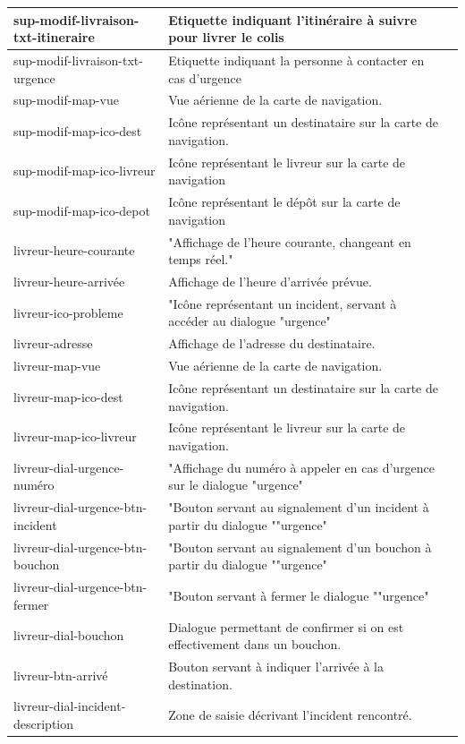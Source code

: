 \documentclass{report}
\begin{document}
\begin{longtable}{|p{5cm}|p{5cm}|c|}
sup-modif-livraison-txt-itineraire&Etiquette indiquant l'itinéraire à suivre pour livrer le colis&\\\hline
sup-modif-livraison-txt-urgence&Etiquette indiquant la personne à contacter en cas d'urgence&\\\hline
sup-modif-map-vue&Vue aérienne de la carte de navigation.&\\\hline
sup-modif-map-ico-dest&Icône représentant un destinataire sur la carte de navigation.&\\\hline
sup-modif-map-ico-livreur&Icône représentant le livreur sur la carte de navigation&\\\hline
sup-modif-map-ico-depot&Icône représentant le dépôt sur la carte de navigation&\\\hline
livreur-heure-courante&"Affichage de l'heure courante, changeant en temps réel."&\\\hline
livreur-heure-arrivée&Affichage de l'heure d'arrivée prévue.&\\\hline
livreur-ico-probleme&"Icône représentant un incident, servant à accéder au dialogue "urgence"&\\\hline
livreur-adresse&Affichage de l'adresse du destinataire.&\\\hline
livreur-map-vue&Vue aérienne de la carte de navigation.&\\\hline
livreur-map-ico-dest&Icône représentant un destinataire sur la carte de navigation.&\\\hline
livreur-map-ico-livreur&Icône représentant le livreur sur la carte de navigation.&\\\hline
livreur-dial-urgence-numéro&"Affichage du numéro à appeler en cas d'urgence sur le dialogue "urgence"&\\\hline
livreur-dial-urgence-btn-incident&"Bouton servant au signalement d'un incident à partir du dialogue ""urgence"&\\\hline
livreur-dial-urgence-btn-bouchon&"Bouton servant au signalement d'un bouchon à partir du dialogue ""urgence"&\\\hline
livreur-dial-urgence-btn-fermer&"Bouton servant à fermer le dialogue ""urgence"&\\\hline
livreur-dial-bouchon&Dialogue permettant de confirmer si on est effectivement dans un bouchon.&\\\hline
livreur-btn-arrivé&Bouton servant à indiquer l'arrivée à la destination.&\\\hline
livreur-dial-incident-description&Zone de saisie décrivant l'incident rencontré.&\\\hline

\end{longtable}
\end{document}
